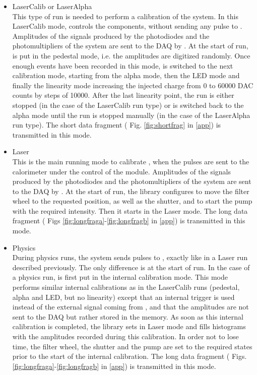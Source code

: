 \begin{itemize}
\item{LaserCalib or LaserAlpha}~\\
This type of run is needed to perform a calibration of the \lasii{} system. In this
LaserCalib mode, \lascar{} controls the \lasii{} components, without sending any
\las{} pulse to \tilecal{}. Amplitudes of the signals produced by the photodiodes
and the photomultipliers of the \lasii{} system are sent to the \atlas{} DAQ by \lascar{}.
At the start of run, \lascar{} is put in the pedestal mode, i.e. the amplitudes
are digitized randomly. Once enough events have been recorded in this mode,
\lascar{} is switched to the next calibration mode, starting from the alpha mode, then the
LED mode and finally the linearity mode increasing the injected charge from 0 to 60000 DAC counts by steps
of 10000. After the last linearity point, the run is either stopped (in the case of the
LaserCalib run type) or \lascar{} is switched back to the alpha mode until the run is stopped
manually (in the case of the LaserAlpha run type). The short data fragment ( Fig. \ref{fig:shortfrag} in \ref{app}) is transmitted in this mode.


\item{Laser}~\\
This is the main running mode to calibrate \tilecal{}, when the \las{} pulses are sent to the
calorimeter under the control of the \shaft{} module. Amplitudes of the signals produced by the 
photodiodes and the photomultipliers of the \lasii{} system are sent to the \atlas{} DAQ by 
\lascar{}. At the start of run, the \lasmodule{} library configures \lascar{} to move the filter
wheel to the requested position, as well as the shutter, and to start the \las{} pump with the 
required intensity. Then it starts \lascar{} in the Laser mode. The long data fragment ( Figs \ref{fig:longfraga}-\ref{fig:longfragb} in \ref{app}) is transmitted in this mode.

\item{Physics}~\\
During physics runs, the \lasii{} system sends \las{} pulses to \tilecal{}, exactly like in
a Laser run described previously. The only difference is at the start of run. In the case of
a physics run, \lascar{} is first put in the internal calibration mode. This mode performs
similar internal calibrations as in the LaserCalib runs (pedestal, alpha and LED, but no
linearity) except that an internal trigger is used instead of the external signal coming from
\shaft{}, and that the amplitudes are not sent to the \atlas{} DAQ but rather stored in the 
\lascar{} memory. As soon as this internal calibration is completed, the \lasmodule{} library
sets \lascar{} in Laser mode and fills histograms with the amplitudes recorded during this
calibration. In order not to lose time, the filter wheel, the shutter and the \las{} pump
are set to the required states prior to the start of the internal calibration. The long data fragment ( Figs. \ref{fig:longfraga}-\ref{fig:longfragb} in \ref{app}) is transmitted in this mode.


\end{itemize}
